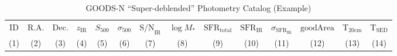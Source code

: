 % 
\begin{table*}

\begin{center}

\caption{ %
    GOODS-N ``Super-deblended'' Photometry Catalog (Example) %
    \label{Table_2} %
}

\begin{tabular}{ cccccccccccccc }

    \hline

        ID & 
        R.A. & 
        Dec. & 
        $z_{\mathrm{IR}}$ & 
        $S_{500}$ & 
        $\sigma_{500}$ & 
        $\mathrm{S/N}_{\mathrm{IR}}$ & 
        $\log{M_{*}}$ & 
        $\mathrm{SFR}_{\mathrm{total}}$ & 
        $\mathrm{SFR}_{\mathrm{IR}}$ & 
        $\sigma_{\mathrm{SFR}_{\mathrm{IR}}}$ & 
        ${\mathrm{goodArea}}$ & 
        T$_{\mathrm{20cm}}$ & 
        T$_{\mathrm{SED}}$ \\ 
        
        (1) & 
        (2) & 
        (3) & 
        (4) & 
        (5) & 
        (6) & 
        (7) & 
        (8) & 
        (9) & 
        (10) & 
        (11) & 
        (12) & 
        (13) & 
        (14) \\ 
    
    \hline


\end{tabular}
\end{center}
\end{table*}
